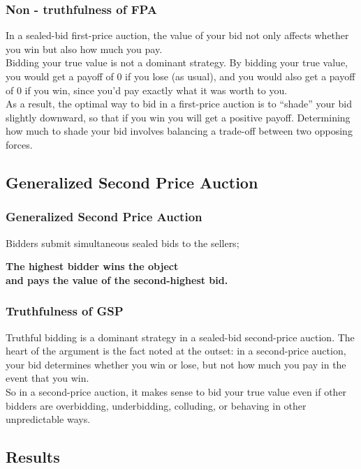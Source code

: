 \documentclass{beamer}
\begin{document}
\begin{frame}
\frametitle{Non - truthfulness of FPA}
In a sealed-bid first-price auction, the value of your bid not only affects whether you win but also how much you pay.\\
\medskip
Bidding your true value is not a dominant strategy. By bidding your true value, you would get a payoff of 0 if you lose (as usual), and you would also get a payoff of 0 if you win, since you’d pay exactly what it was worth to you.\\
\medskip
As a result, the optimal way to bid in a first-price auction is to “shade” your bid slightly downward, so that if you win you will get a positive payoff. Determining how much to shade your bid involves balancing a trade-off between two opposing forces.
\end{frame}

\subsection{Generalized Second Price Auction}
\begin{frame}
\frametitle{Generalized Second Price Auction}
Bidders submit simultaneous sealed bids to the sellers;
\begin{center} 
\textbf{The highest bidder wins the object \\
and pays the value of the second-highest bid.} 
\end{center}
\end{frame}

\begin{frame}
\frametitle{Truthfulness of GSP}
Truthful bidding is a dominant strategy in a sealed-bid second-price auction. The heart of the argument is the fact noted at the outset: in a second-price auction, your bid determines whether you win or lose, but not how much you pay in the event that you win. \\
\medskip
So in a second-price auction, it makes sense to bid your true value even if other bidders are overbidding, underbidding, colluding, or behaving in other unpredictable ways.
\end{frame}

\subsection{Results}
\end{document}
